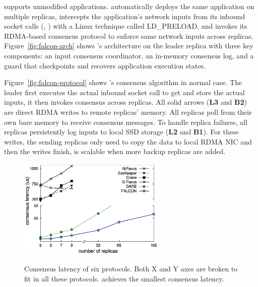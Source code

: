 \falcon supports unmodified applications. \falcon automatically deploys the 
same application on multiple replicas, intercepts the application's 
network inputs from its inbound socket calls (\eg, \recv) with a Linux 
technique called LD\_PRELOAD, and invokes its RDMA-based consensus protocol to 
enforce same network inputs across replicas. Figure~\ref{fig:falcon-arch} 
shows \falcon's architecture on the leader replica with three key components: 
an input consensus coordinator, an in-memory consensus log, and a guard that 
checkpoints and recovers application execution states.

Figure~\ref{fig:falcon-protocol} shows \falcon's consensus algorithm in normal 
case. The leader first executes the actual inbound socket call to get and store 
the actual inputs, it then invokes consensus across replicas. All 
solid arrows (\textbf{L3} and \textbf{B2}) are direct RDMA writes to remote 
replicas' memory. All replicas poll from their own bare memory to receive 
consensus messages. To handle replica failures, all replicas persistently log 
inputs to local SSD storage (\textbf{L2} and \textbf{B1}). For these writes, 
the sending replicas only need to copy the data to local RDMA NIC and then the 
writes finish, \falcon is scalable when more backup replicas are added.




\begin{figure}
  \vspace{-.1in}
  \includegraphics[width=7cm]{figures/traditional_paxos_latency.ps}\\
  \vspace{-.3in}
  \caption{Consensus latency of six \paxos protocols. Both X and Y axes are 
broken to fit in all these protocols. \falcon achieves the smallest consensus 
latency.}
  \label{fig:scalability}
\end{figure}

